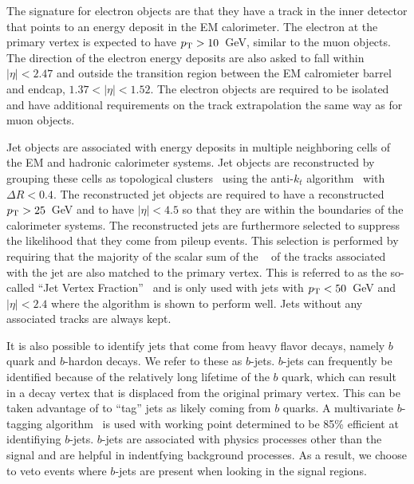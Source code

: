 The signature for electron objects are that they have a track in the inner
detector that points to an energy deposit in the EM calorimeter.
The electron at the primary vertex is expected to have $p_{\mathrm{T}}>10$~GeV, similar
to the muon objects. The direction of the electron energy 
deposits are also asked to fall within $|\eta| < 2.47$ and outside the 
transition region between the EM calromieter barrel and endcap, $1.37 < |\eta| < 1.52$.
The electron objects are required to be isolated and have additional
requirements on the track extrapolation the same way as for muon objects.  


Jet objects are associated with energy deposits in multiple 
neighboring cells of the EM and hadronic calorimeter systems.
Jet objects are reconstructed by grouping these cells
as topological clusters~\cite{Lampl:1099735}
using the anti-$k_t$ algorithm~\cite{Cacciari:2008gp} with $\Delta R < 0.4$.
The reconstructed jet objects are required to have a reconstructed
$p_{\mathrm{T}}>25$~GeV and to have $|\eta|<4.5$ so that
they are within the boundaries of the calorimeter systems.
The reconstructed jets are furthermore selected to suppress the likelihood that
they come from pileup events. This selection is performed by 
requiring that the majority of the
scalar sum of the \pt~ of the tracks associated with the 
jet are also matched to the primary vertex. This is referred to
as the so-called ``Jet Vertex Fraction''~\cite{Miller:1206864, ATLAS-CONF-2013-083}
and is only used with jets with $p_{\mathrm{T}} < 50$~GeV and $|\eta|<2.4$ where
the algorithm is shown to perform well. Jets without any associated
tracks are always kept. 

It is also possible to identify jets that come from heavy flavor
decays, namely $b$ quark and $b$-hardon decays. We refer
to these as $b$-jets. $b$-jets can frequently be identified 
because of the relatively long lifetime of the $b$ quark, which can 
result in a decay vertex that is displaced from the original primary vertex.
This can be taken advantage of to ``tag'' jets as likely coming from
$b$ quarks. A multivariate $b$-tagging algorithm~\cite{ATLAS-CONF-2014-004}
is used with working point determined to be 85\% efficient at
identifiying $b$-jets. %
$b$-jets are associated with physics processes other than the signal
and are helpful in indentfying background processes.
As a result, we choose to veto events where 
$b$-jets are present when looking in the signal regions.


